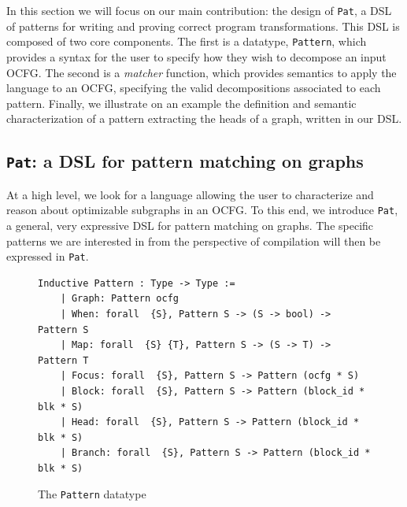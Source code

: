 \documentclass[11pt]{article}
\newcommand{\inlinecoq}[1]{\mbox{\lstinline[style=customcoq,columns=fixed,basewidth=.48em]{#1}}}
\newcommand{\ilc}[1]{\inlinecoq{#1}}
\newcommand{\yzt}[1]{\textcolor{ForestGreen!50}{#1}}
\newcommand{\cut}[1]{\textcolor{Gray!40}{#1}}
\newcommand{\ocfg}{OCFG\xspace}
\newcommand{\pat}{\texttt{Pat}\xspace}
\begin{document}
In this section we will focus on our main contribution: the design of \pat{}, a DSL of patterns for writing and proving correct program transformations. This DSL is composed of two core components. The first is a datatype, \ilc{Pattern}, which provides a syntax for the user to specify how they wish to decompose an input \ocfg. The second is a \emph{matcher} function, which provides semantics to apply the language to an \ocfg{}, specifying the valid decompositions associated to each pattern. Finally, we illustrate on an example the definition and semantic characterization of a pattern extracting the heads of a graph, written in our DSL\@.


\subsection{\pat: a DSL for pattern matching on graphs}

\yzt{At a high level, we look for a language allowing the user to characterize and reason about optimizable subgraphs in an \ocfg. 
To this end, we introduce \pat, a general, very expressive DSL for pattern matching on graphs. The specific patterns we are interested in from the perspective of compilation will then be expressed in \pat.}

\begin{figure}
  \begin{lstlisting}[style=customcoq,basicstyle=\small\ttfamily]
    Inductive Pattern : Type -> Type :=
    | Graph: Pattern ocfg
    | When: forall  {S}, Pattern S -> (S -> bool) -> Pattern S
    | Map: forall  {S} {T}, Pattern S -> (S -> T) -> Pattern T
    | Focus: forall  {S}, Pattern S -> Pattern (ocfg * S)
    | Block: forall  {S}, Pattern S -> Pattern (block_id * blk * S)
    | Head: forall  {S}, Pattern S -> Pattern (block_id * blk * S)
    | Branch: forall  {S}, Pattern S -> Pattern (block_id * blk * S)
  \end{lstlisting}
  \caption{The \ilc{Pattern} datatype}
  \label{fig:pat}
\end{figure}
\end{document}
